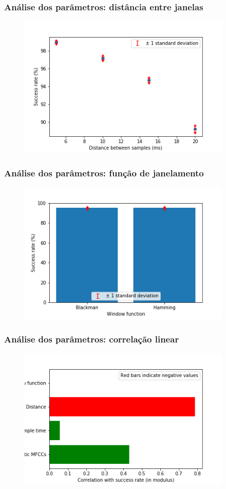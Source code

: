 \documentclass{beamer}
\begin{document}
\begin{frame}
    \frametitle{Análise dos parâmetros: distância entre janelas}

    \begin{figure}[]
        \centering
        \includegraphics[height=192pt]{Figure_3.png}
    \end{figure}

\end{frame}
\begin{frame}
    \frametitle{Análise dos parâmetros: função de janelamento}

    \begin{figure}[]
        \centering
        \includegraphics[height=192pt]{Figure_4.png}
    \end{figure}

\end{frame}
\begin{frame}
    \frametitle{Análise dos parâmetros: correlação linear}

    \begin{figure}[]
        \centering
        \includegraphics[height=192pt]{Figure_5.png}
    \end{figure}

\end{frame}
\end{document}
